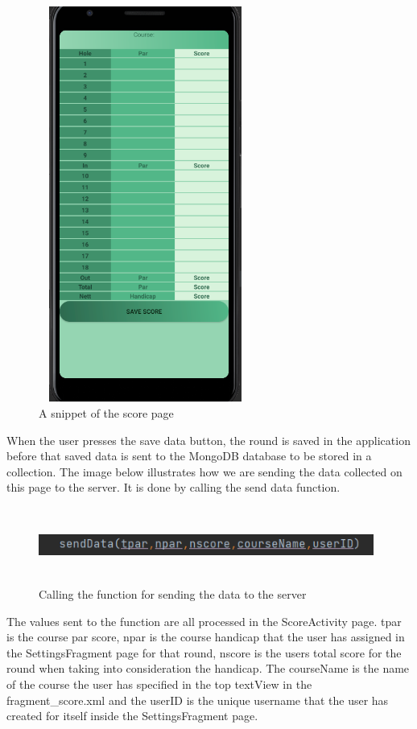 \begin{figure}[H]
    \centering
    \includegraphics[width=7cm, height = 13cm]{img/scorePage.PNG}
    \caption{A snippet of the score page}
    \label{fig:A snippet of the score page}
\end{figure}
When the user presses the save data button, the round is saved in the application before that saved data is sent to the MongoDB database to be stored in a collection.
\newpage
The image below illustrates how we are sending the data collected on this page to the server. It is done by calling the send data function.
\begin{figure}[H]
    \centering
    \includegraphics[width=11cm, height = 2.5cm]{img/sendDataFCall.PNG}
    \caption{Calling the function for sending the data to the server}
    \label{fig:Calling the function for sending the data to the server}
\end{figure}
The values sent to the function are all processed in the ScoreActivity page. tpar is the course par score, npar is the course handicap that the user has assigned in the SettingsFragment page for that round, nscore is the users total score for the round when taking into consideration the handicap. The courseName is the name of the course the user has specified in the top textView in the fragment\_score.xml and the userID is the unique username that the user has created for itself inside the SettingsFragment page.
